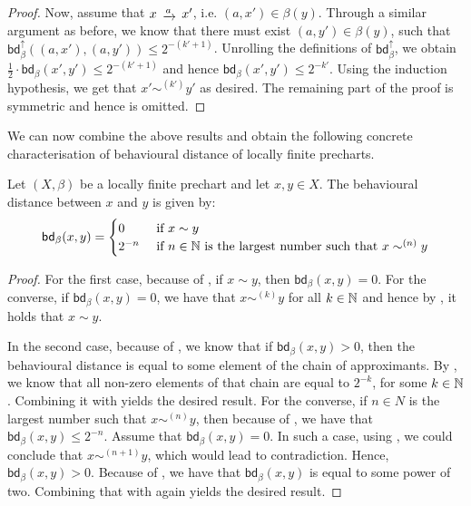\begin{proof}
		Now, assume that $x \tr{a} x'$, i.e. $(a,x') \in \beta(y)$. Through a similar argument as before, we know that there must exist $(a,y')\in \beta(y)$, such that $\mathsf{bd}_\beta^\uparrow((a,x'),(a,y')) \leq 2^{-(k'+1)}$. Unrolling the definitions of $\mathsf{bd}_\beta^\uparrow$, we obtain $\frac{1}{2} \cdot \mathsf{bd}_{\beta}(x',y') \leq 2^{-(k'+1)}$ and hence $\mathsf{bd}_{\beta}(x',y') \leq 2^{-k'}$. Using the induction hypothesis, we get that $x' \sim^{(k')} y'$ as desired. The remaining part of the proof is symmetric and hence is omitted.
\end{proof}
We can now combine the above results and obtain the following concrete characterisation of behavioural distance of locally finite precharts.
\begin{theorem}\label{thm:concrete_distance}
Let $(X,\beta)$ be a locally finite prechart and let $x,y \in X$. The behavioural distance between $x$ and $y$ is given by:
	$$\mathsf{bd}_\beta(x,y) = \begin{cases}
		0 & \text{ if } x \sim y\\
		2^{-n} & \text{ if } n \in \mathbb{N} \text{ is the largest number such that } x\sim^{(n)} y
	\end{cases}$$
\end{theorem}
\begin{proof}
	For the first case, because of , if $x \sim y$, then $\mathsf{bd}_{\beta}(x,y)=0$. For the converse, if $\mathsf{bd}_{\beta}(x,y)=0$, we have that $x \sim^{(k)} y$ for all $k \in \mathbb{N}$ and hence by , it holds that $x \sim y$.
	
	 In the second case, because of , we know that if $\mathsf{bd}_\beta(x,y) > 0$, then the behavioural distance is equal to some element of the chain of approximants. By , we know that all non-zero elements of that chain are equal to $2^{-k}$, for some $k \in \mathbb{N}$. Combining it with  yields the desired result. 
	 For the converse, if $n \in N$ is the largest number such that $x \sim^{(n)} y$, then because of , we have that $\mathsf{bd}_\beta(x,y)\leq 2^{-n}$. Assume that $\mathsf{bd}_\beta(x,y)=0$. In such a case, using , we could conclude that $x \sim^{(n+1)} y$, which would lead to contradiction. Hence, $\mathsf{bd}_\beta(x,y)>0$. Because of , we have that $\mathsf{bd}_\beta(x,y)$ is equal to some power of two. Combining that with  again yields the desired result.

\end{proof}
